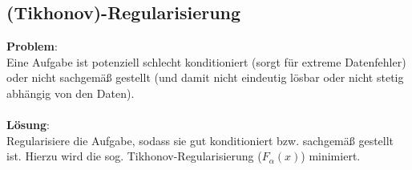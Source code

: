 \subsection{(Tikhonov)-Regularisierung}%
\label{lar:sub:regularisierung}
\textbf{Problem}:\\Eine Aufgabe ist potenziell schlecht konditioniert (sorgt für extreme Datenfehler) oder nicht sachgemäß gestellt (und damit nicht eindeutig lösbar oder nicht stetig abhängig von den Daten).\\\\
\textbf{Lösung}:\\Regularisiere die Aufgabe, sodass sie gut konditioniert bzw. sachgemäß gestellt ist. Hierzu wird die sog. Tikhonov-Regularisierung ($F_\alpha(x)$) minimiert.